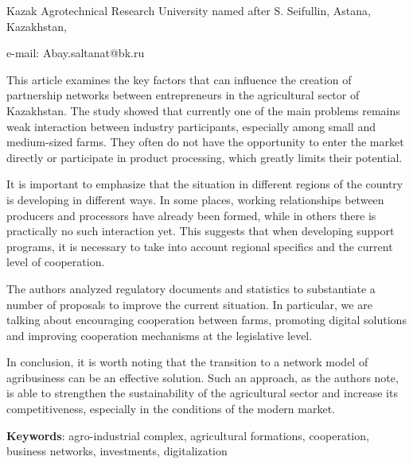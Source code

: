 \begin{affiliation}
Kazak Agrotechnical Research University named after S. Seifullin, Astana, Kazakhstan,

e-mail: Abay.saltanat@bk.ru
\end{affiliation}

This article examines the key factors that can influence the creation of
partnership networks between entrepreneurs in the agricultural sector of
Kazakhstan. The study showed that currently one of the main problems
remains weak interaction between industry participants, especially among
small and medium-sized farms. They often do not have the opportunity to
enter the market directly or participate in product processing, which
greatly limits their potential.

It is important to emphasize that the situation in different regions of
the country is developing in different ways. In some places, working
relationships between producers and processors have already been formed,
while in others there is practically no such interaction yet. This
suggests that when developing support programs, it is necessary to take
into account regional specifics and the current level of cooperation.

The authors analyzed regulatory documents and statistics to substantiate
a number of proposals to improve the current situation. In particular,
we are talking about encouraging cooperation between farms, promoting
digital solutions and improving cooperation mechanisms at the
legislative level.

In conclusion, it is worth noting that the transition to a network model
of agribusiness can be an effective solution. Such an approach, as the
authors note, is able to strengthen the sustainability of the
agricultural sector and increase its competitiveness, especially in the
conditions of the modern market.

{\bfseries Keywords}: agro-industrial complex, agricultural formations,
cooperation, business networks, invest\-ments, digitalization

